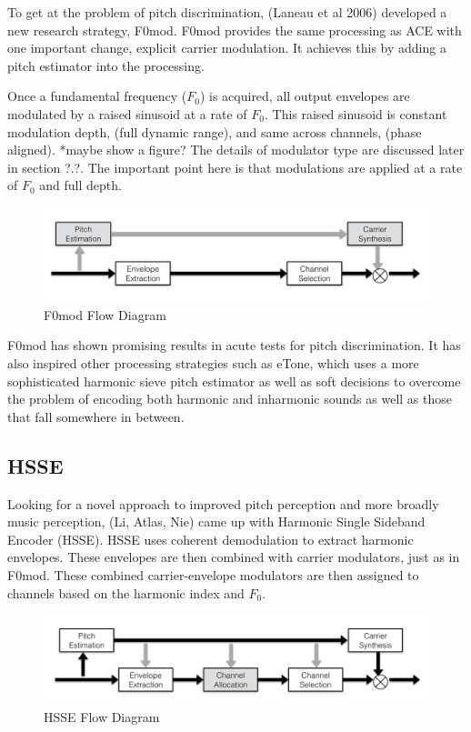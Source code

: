 \documentclass [11pt, proquest] {uwthesis}[2015/03/03]
\begin{document}
To get at the problem of pitch discrimination, (Laneau et al 2006) developed a new research strategy, F0mod.  F0mod provides the same processing as ACE with one important change, explicit carrier modulation.  It achieves this by adding a pitch estimator into the processing.

Once a fundamental frequency ($F_0$) is acquired, all output envelopes are modulated by a raised sinusoid at a rate of $F_0$.  This raised sinusoid is constant modulation depth, (full dynamic range), and same across channels, (phase aligned).  *maybe show a figure?  The details of modulator type are discussed later in section ?.?.  The important point here is that modulations are applied at a rate of $F_0$ and full depth.

\begin{figure}[!ht]
  \centering
    \includegraphics[width=1\textwidth]{F0mod_flow_diagramTEMP}   
    \caption{F0mod Flow Diagram}
\end{figure}

F0mod has shown promising results in acute tests for pitch discrimination.  It has also inspired other processing strategies such as eTone, which uses a more sophisticated harmonic sieve pitch estimator as well as soft decisions to overcome the problem of encoding both harmonic and inharmonic sounds as well as those that fall somewhere in between.

\subsection{HSSE}

Looking for a novel approach to improved pitch perception and more broadly music perception, (Li, Atlas, Nie) came up with Harmonic Single Sideband Encoder (HSSE).  HSSE uses coherent demodulation to extract harmonic envelopes.  These envelopes are then combined with carrier modulators, just as in F0mod.  These combined carrier-envelope modulators are then assigned to channels based on the harmonic index and $F_0$.

\begin{figure}[!ht]
  \centering
    \includegraphics[width=1\textwidth]{HSSE_flow_diagramTEMP}   
    \caption{HSSE Flow Diagram}
\end{figure}
\end{document}
